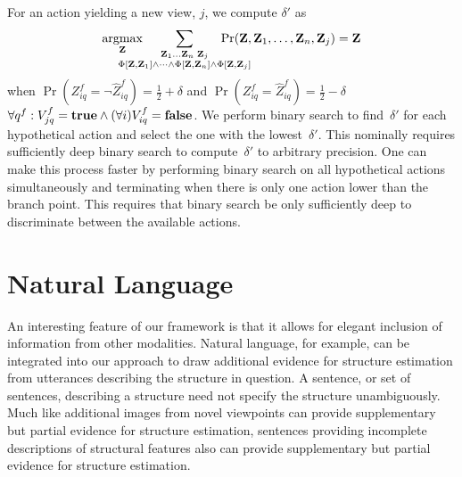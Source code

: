 \par\noindent
%
For an action yielding a new view, $j$, we compute $\delta'$ as
%
\begin{equation*}
  \argmax_{\mathbf{Z}}\hspace{-5ex}
  \sum_{\substack{\mathbf{Z}_1\ldots\mathbf{Z}_n\;\mathbf{Z}_j\\
      \Phi[\mathbf{Z},\mathbf{Z}_1]\wedge\cdots\wedge\Phi[\mathbf{Z},\mathbf{Z}_n]
      \wedge\Phi[\mathbf{Z},\mathbf{Z}_j]}}\hspace{-6ex}
  \Pr(\mathbf{Z},\mathbf{Z}_1,\ldots,\mathbf{Z}_n,\mathbf{Z}_j)=\mathbf{Z}
\end{equation*}
when
\begin{math}
    \Pr(Z^f_{iq}=\neg\hat{Z}^f_{iq})=\frac{1}{2}+\delta
\end{math}
and
\begin{math}
    \Pr(Z^f_{iq}=\hat{Z}^f_{iq})=\frac{1}{2}-\delta
\end{math}
$\forall q^f:V^f_{jq}=\mathbf{true}\wedge(\forall i)V^f_{iq}=\mathbf{false}$.
%
We perform binary search to find~$\delta'$ for each hypothetical action
and select the one with the lowest~$\delta'$.
%
This nominally requires sufficiently deep binary search to compute~$\delta'$ to
arbitrary precision.
%
One can make this process faster by performing binary search on all
hypothetical actions simultaneously and terminating when there is only one
action lower than the branch point.
%
This requires that binary search be only sufficiently deep to discriminate
between the available actions.

\par\vspace{-1ex}
\section{Natural Language}
\label{sec:language}

An interesting feature of our framework is that it allows for elegant inclusion
of information from other modalities.
%
Natural language, for example, can be integrated into our approach to draw
additional evidence for structure estimation from utterances describing the
structure in question.
%
A sentence, or set of sentences, describing a structure need not specify the
structure unambiguously.
%
Much like additional images from novel viewpoints can provide supplementary but
partial evidence for structure estimation, sentences providing incomplete
descriptions of structural features also can provide supplementary but partial
evidence for structure estimation.

